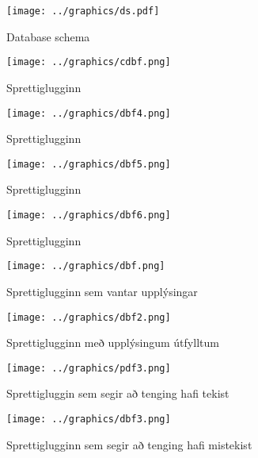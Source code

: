 \documentclass[12pt, git, final]{rureport}
\begin{document}
\pagebreak
\begin{figure}
	\centering 
	\texttt{[image: ../graphics/ds.pdf]}
	\caption{Database schema \label{fig:dataschema}}
\end{figure}

\begin{figure}
	\centering 
	\texttt{[image: ../graphics/cdbf.png]}
	\caption{Sprettiglugginn \label{fig:cdbf}}
\end{figure}

\begin{figure}
	\centering 
	\texttt{[image: ../graphics/dbf4.png]}
	\caption{Sprettiglugginn \label{fig:dbf4}}
\end{figure}

\begin{figure}
	\centering 
	\texttt{[image: ../graphics/dbf5.png]}
	\caption{Sprettiglugginn \label{fig:dbf5}}
\end{figure}

\begin{figure}
	\centering 
	\texttt{[image: ../graphics/dbf6.png]}
	\caption{Sprettiglugginn\label{fig:dbf6}}
\end{figure}

\begin{figure}
	\centering 
	\texttt{[image: ../graphics/dbf.png]}
	\caption{Sprettiglugginn sem vantar upplýsingar  \label{fig:dbf}}
\end{figure}

\begin{figure}
	\centering 
	\texttt{[image: ../graphics/dbf2.png]}
	\caption{Sprettiglugginn með upplýsingum útfylltum \label{fig:dbf2}}
\end{figure}

\begin{figure}
	\centering 
	\texttt{[image: ../graphics/pdf3.png]}
	\caption{Sprettigluggin sem segir að tenging hafi tekist \label{fig:pdf3}}
\end{figure}

\begin{figure}
	\centering 
	\texttt{[image: ../graphics/dbf3.png]}
	\caption{Sprettiglugginn sem segir að tenging hafi mistekist \label{fig:dbf3}}
\end{figure}



\clearpage
\printbibliography
\end{document}
